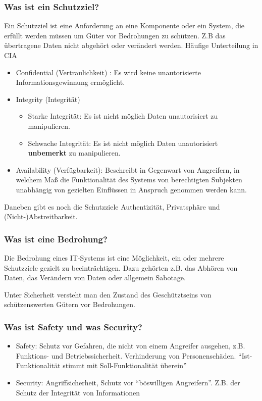 	\subsubsection{Was ist ein Schutzziel?}
	Ein Schutzziel ist eine Anforderung an eine Komponente oder ein System, die erfüllt werden müssen um Güter vor Bedrohungen zu schützen. Z.B das übertragene Daten nicht abgehört oder verändert werden.
	Häufige Unterteilung in CIA
	\begin{itemize}
		\item Confidential (Vertraulichkeit) : Es wird keine unautorisierte Informationsgewinnung ermöglicht.
		\item Integrity (Integrität) 
		\begin{itemize}
			\item Starke Integrität: Es ist nicht möglich Daten unautorisiert zu manipulieren.
			\item Schwache Integrität: Es ist nicht möglich Daten unautorisiert \textbf{unbemerkt} zu manipulieren.
		\end{itemize}
		\item Availability (Verfügbarkeit): Beschreibt in Gegenwart von Angreifern, in welchem Maß die Funktionalität des Systems von berechtigten Subjekten unabhängig von gezielten Einflüssen in Anspruch genommen werden kann.
	\end{itemize}
	Daneben gibt es noch die Schutzziele Authentizität, Privatsphäre und (Nicht-)Abstreitbarkeit.
	
	\subsubsection{Was ist eine Bedrohung?}
	Die Bedrohung eines IT-Systems ist eine Möglichkeit, ein oder mehrere Schutzziele gezielt zu beeinträchtigen. Dazu gehörten z.B. das Abhören von Daten, das Verändern von Daten oder allgemein Sabotage.
	
	Unter Sicherheit versteht man den Zustand des Geschütztseins von schützenswerten Gütern vor Bedrohungen. 
	\subsubsection{Was ist Safety und was Security?}
	\begin{itemize}
		\item Safety: Schutz vor Gefahren, die nicht von einem Angreifer ausgehen, z.B. Funktions- und Betriebssicherheit. Verhinderung von Personenschäden. "`Ist-Funktionalität stimmt mit Soll-Funktionalität überein"'
		\item Security: Angriffsicherheit, Schutz vor "`böswilligen Angreifern"'. Z.B. der Schutz der Integrität von Informationen
	\end{itemize}
	
